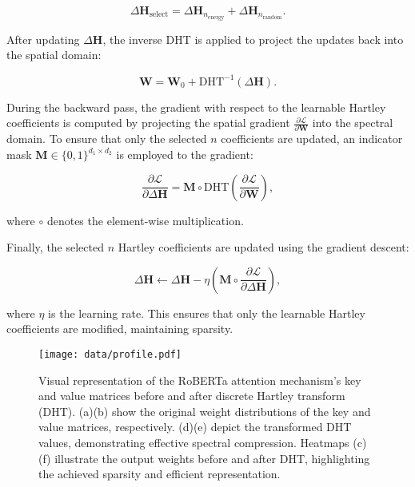     
\begin{small}
\begin{equation}
    \Delta \mathbf{H}_{\text{select}} = \Delta \mathbf{H}_{n_{\text{energy}}} + \Delta \mathbf{H}_{n_{\text{random}}}.
\end{equation}
\end{small}

After updating $\Delta \mathbf{H}$, the inverse DHT is applied to project the updates back into the spatial domain:

\begin{small}
\begin{equation}
\label{eq3}
    \mathbf{W} = \mathbf{W}_0 + \text{DHT}^{-1}(\Delta \mathbf{H}).
\end{equation}    
\end{small}


During the backward pass, the gradient with respect to the learnable Hartley coefficients is computed by projecting the spatial gradient $\frac{\partial \mathcal{L}}{\partial \mathbf{W}}$ into the spectral domain. To ensure that only the selected $n$ coefficients are updated, an indicator mask $\mathbf{M} \in \{0,1\}^{d_1 \times d_2}$ is employed to the gradient:

\begin{small}
\begin{equation}
    \frac{\partial \mathcal{L}}{\partial \Delta \mathbf{H}} = \mathbf{M} \circ \text{DHT} \left( \frac{\partial \mathcal{L}}{\partial \mathbf{W}} \right),
\end{equation}    
\end{small}
where $\circ$ denotes the element-wise multiplication. 

Finally, the selected $n$ Hartley coefficients are updated using the gradient descent:

\begin{small}
\begin{equation}
    \Delta \mathbf{H} \leftarrow \Delta \mathbf{H} - \eta \left( \mathbf{M} \circ \frac{\partial \mathcal{L}}{\partial \Delta \mathbf{H}} \right),
\end{equation}
\end{small}
where $\eta$ is the learning rate. This ensures that only the learnable Hartley coefficients are modified, maintaining sparsity.

\begin{figure}[!t]
    \centering
    \texttt{[image: data/profile.pdf]}
    \caption{\small 
    Visual representation of the RoBERTa attention mechanism's key and value matrices before and after discrete Hartley transform (DHT). (a)(b) show the original weight distributions of the key and value matrices, respectively. (d)(e) depict the transformed DHT values, demonstrating effective spectral compression. Heatmaps (c)(f) illustrate the output weights before and after DHT, highlighting the achieved sparsity and efficient representation.}
    \label{fig:profile}
\end{figure}







